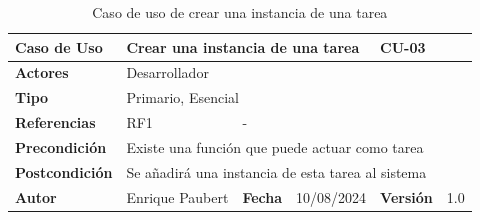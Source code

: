 \begin{table}[!ht]
    \begin{tabular}{|l|l|l|l|l|l|}
	\hline
	\textbf{Caso de Uso} & \multicolumn{3}{l|}{Crear una instancia de una tarea} & \multicolumn{2}{l|}{CU-03} \\ \hline
	\textbf{Actores} & \multicolumn{5}{l|}{Desarrollador} \\ \hline
	\textbf{Tipo} & \multicolumn{5}{l|}{Primario, Esencial} \\ \hline
	\textbf{Referencias} & RF1 & \multicolumn{4}{l|}{-} \\ \hline
	\textbf{Precondición} & \multicolumn{5}{l|}{Existe una función que puede actuar como tarea} \\ \hline
	\textbf{Postcondición} & \multicolumn{5}{l|}{Se añadirá una instancia de esta tarea al sistema} \\ \hline
	\textbf{Autor} & Enrique Paubert & \textbf{Fecha} & 10/08/2024 & \textbf{Versión} & 1.0 \\ \hline
    \end{tabular}%
    \caption{Caso de uso de crear una instancia de una tarea}
    \label{CU-03}
\end{table}

